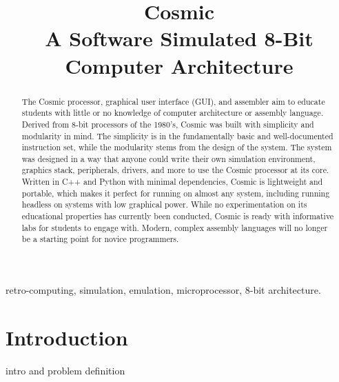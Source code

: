 \documentclass[conference]{IEEEtran}
\begin{document}
\title{Cosmic\\A Software Simulated 8-Bit Computer Architecture}
\author{
\and
{}
}
\maketitle


\begin{abstract}
The Cosmic processor, graphical user interface (GUI), and assembler aim to educate students with little or no knowledge of computer architecture or assembly language. Derived from 8-bit processors of the 1980’s, Cosmic was built with simplicity and modularity in mind. The simplicity is in the fundamentally basic and well-documented instruction set, while the modularity stems from the design of the system. The system was designed in a way that anyone could write their own simulation environment, graphics stack, peripherals, drivers, and more to use the Cosmic processor at its core. Written in C++ and Python with minimal dependencies, Cosmic is lightweight and portable, which makes it perfect for running on almost any system, including running headless on systems with low graphical power. While no experimentation on its educational properties has currently been conducted, Cosmic is ready with informative labs for students to engage with. Modern, complex assembly languages will no longer be a starting point for novice programmers.
\end{abstract}

\begin{IEEEkeywords}
retro-computing, simulation, emulation, microprocessor, 8-bit architecture.
\end{IEEEkeywords}


\section{Introduction}
intro and problem definition
\end{document}
